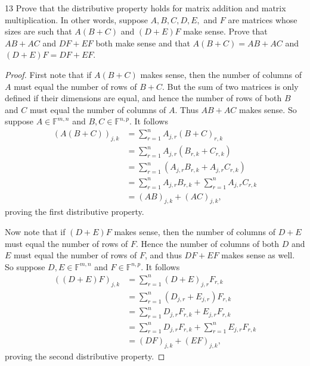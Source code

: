 \documentclass{extarticle}
\newenvironment{problem}[1]{\begin{prob*}{#1}{}}{\end{prob*}}
\newcommand{\F}{\mathbb{F}}
\begin{document}
\begin{problem}{13}
Prove that the distributive property holds for matrix addition and matrix multiplication.  In other words, suppose $A,B,C,D,E,$ and $F$ are matrices whose sizes are such that $A(B+C)$ and $(D+E)F$ make sense.  Prove that $AB+AC$ and $DF + EF$ both make sense and that $A(B+ C) = AB + AC$ and $(D + E)F = DF + EF$.  
\end{problem}
\begin{proof}
First note that if $A(B+C)$ makes sense, then the number of columns of $A$ must equal the number of rows of $B+C$.  But the sum of two matrices is only defined if their dimensions are equal, and hence the number of rows of both $B$ and $C$ must equal the number of columns of $A$.  Thus $AB + AC$ makes sense.  So suppose $A\in\F^{m,n}$ and $B,C\in\F^{n,p}$.  It follows
\begin{align*}
\left(A(B+C)\right)_{j,k} &= \sum_{r = 1}^n A_{j, r}(B + C)_{r,k}\\
&= \sum_{r = 1}^n A_{j, r}(B_{r,k} + C_{r,k})\\
&= \sum_{r = 1}^n\left(A_{j,r}B_{r,k} + A_{j,r}C_{r,k}\right)\\
&=  \sum_{r = 1}^nA_{j,r}B_{r,k} +  \sum_{r = 1}^nA_{j,r}C_{r,k} \\
&= (AB)_{j,k} + (AC)_{j,k},
\end{align*}
proving the first distributive property.
\par Now note that if $(D + E)F$ makes sense, then the number of columns of $D + E$ must equal the number of rows of $F$.  Hence the number of columns of both $D$ and $E$ must equal the number of rows of $F$, and thus $DF+ EF$ makes sense as well.  So suppose $D,E \in\F^{m,n}$ and $F\in\F^{n,p}$.  It follows
\begin{align*}
\left((D+E)F\right)_{j,k} &= \sum_{r = 1}^n (D+E)_{j,r} F_{r, k}\\
&= \sum_{r = 1}^n (D_{j,r} + E_{j,r})F_{r,k}\\
&= \sum_{r = 1}^n D_{j,r}F_{r,k} + E_{j,r}F_{r,k}\\
&= \sum_{r=1}^n D_{j,r}F_{r,k} + \sum_{r = 1}^nE_{j,r}F_{r,k}\\
&= (DF)_{j,k} + (EF)_{j,k},
\end{align*}
proving the second distributive property.
\end{proof}
\end{document}
